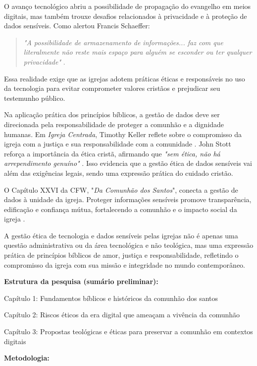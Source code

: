 \documentclass[12pt,a4paper]{article}
\begin{document}
O avanço tecnológico abriu a possibilidade de propagação do evangelho em meios digitais, mas também trouxe desafios relacionados à privacidade e à proteção de dados sensíveis. Como alertou Francis Schaeffer:

\begin{quote}
\textit{"A possibilidade de armazenamento de informações... faz com que literalmente não reste mais espaço para alguém se esconder ou ter qualquer privacidade"} \cite[p. 180]{schaeffer2002}.
\end{quote}

Essa realidade exige que as igrejas adotem práticas éticas e responsáveis no uso da tecnologia para evitar comprometer valores cristãos e prejudicar seu testemunho público.

Na aplicação prática dos princípios bíblicos, a gestão de dados deve ser direcionada pela responsabilidade de proteger a comunhão e a dignidade humanas. Em \textit{Igreja Centrada}, Timothy Keller reflete sobre o compromisso da igreja com a justiça e sua responsabilidade com a comunidade \cite[p. 209]{keller2014}. John Stott reforça a importância da ética cristã, afirmando que \textit{"sem ética, não há arrependimento genuíno"} \cite[p. 51]{stott2008}. Isso evidencia que a gestão ética de dados sensíveis vai além das exigências legais, sendo uma expressão prática do cuidado cristão.

O Capítulo XXVI da CFW, "\textit{Da Comunhão dos Santos}", conecta a gestão de dados à unidade da igreja. Proteger informações sensíveis promove transparência, edificação e confiança mútua, fortalecendo a comunhão e o impacto social da igreja \cite{cfw}.

A gestão ética de tecnologia e dados sensíveis pelas igrejas não é apenas uma questão administrativa ou da área tecnológica e não teológica, mas uma expressão prática de princípios bíblicos de amor, justiça e responsabilidade, refletindo o compromisso da igreja com sua missão e integridade no mundo contemporâneo.

\noindent
\textbf{Estrutura da pesquisa (sumário preliminar):}

\noindent
Capítulo 1: Fundamentos bíblicos e históricos da comunhão dos santos

\noindent
Capítulo 2: Riscos éticos da era digital que ameaçam a vivência da comunhão

\noindent
Capítulo 3: Propostas teológicas e éticas para preservar a comunhão em contextos digitais

\noindent
\textbf{Metodologia:}
\end{document}

